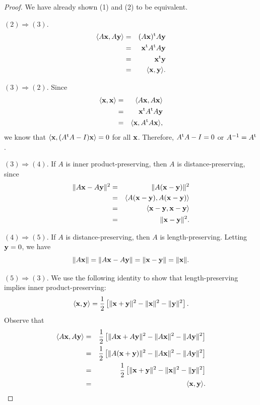  
\begin{proof}
We have already shown (1) and (2) to be equivalent.
 
$(2) \Rightarrow (3)$.
\begin{eqnarray*}
\langle A{\bold x}, A{\bold y} \rangle
& = &
(A {\bold x})^{\rm t} A {\bold y} \\
& = &
{\bold x}^{\rm t} A^{\rm t} A {\bold y} \\
& = &
{\bold x}^{\rm t} {\bold y} \\
& = &
\langle {\bold x}, {\bold y} \rangle.
\end{eqnarray*}
 
$(3) \Rightarrow (2)$.
Since
\begin{eqnarray*}
\langle {\bold x}, {\bold x} \rangle
& = &
\langle A{\bold x}, A{\bold x} \rangle \\
& = &
{\bold x}^{\rm t} A^{\rm t} A {\bold y} \\
& = &
\langle {\bold x}, A^{\rm t} A{\bold x} \rangle,
\end{eqnarray*}
we know that $\langle {\bold x}, (A^{\rm t} A - I){\bold x} \rangle =
0$ for all ${\bold x}$.  Therefore, $A^{\rm t} A -I = 0$ or $A^{-1} =
A^{\rm t}$. 
 
 
$(3) \Rightarrow (4)$.
If $A$ is inner product-preserving, then $A$ is distance-preserving,
since 
\begin{eqnarray*}
\| A{\bold x} - A{\bold y} \|^2
& = &
\| A({\bold x} - {\bold y}) \|^2 \\
& = &
\langle
A({\bold x} - {\bold y}), A({\bold x} - {\bold y})
\rangle \\
& = &
\langle
{\bold x} - {\bold y}, {\bold x} - {\bold y}
\rangle \\
& = &
\| {\bold x} - {\bold y} \|^2.
\end{eqnarray*}
 
 
$(4) \Rightarrow (5)$.
If $A$ is distance-preserving, then $A$ is length-preserving. Letting
${\bold y} = 0$, we have
\[
\| A{\bold x}\|
= \| A{\bold x}- A{\bold y} \|
= \| {\bold x}- {\bold y} \|
= \| {\bold x} \|.
\]
 
 
$(5) \Rightarrow (3)$.
We use the following identity to show that length-preserving implies
inner product-preserving: 
\[
\langle {\bold x}, {\bold y} \rangle
=
\frac{1}{2}
\left[
\|{\bold x} +{\bold y}\|^2 -
 \|{\bold x}\|^2 - \|{\bold y}\|^2
\right].
\]
Observe that
\begin{eqnarray*}
\langle A {\bold x}, A {\bold y} \rangle
& = &
\frac{1}{2}
\left[
\|A {\bold x} + A {\bold y} \|^2
- \|A {\bold x} \|^2 -  \|A {\bold y} \|^2
\right] \\
& = &
\frac{1}{2}
\left[
\|A ( {\bold x} + {\bold y} ) \|^2
- \|A {\bold x} \|^2 -  \|A {\bold y} \|^2
\right] \\
& = &
\frac{1}{2}
\left[
\|{\bold x} + {\bold y}\|^2
- \|{\bold x}\|^2 - \|{\bold y}\|^2
\right] \\
& = &
\langle {\bold x}, {\bold y} \rangle.
\end{eqnarray*}
\end{proof}
 
